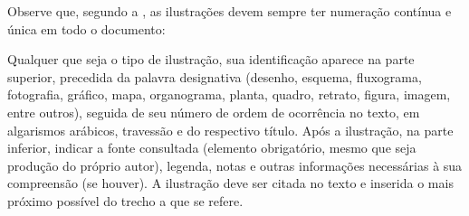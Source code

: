 Observe que, segundo a , as
ilustrações devem sempre ter numeração contínua e única em todo o documento:

\begin{citacao}
Qualquer que seja o tipo de ilustração, sua identificação aparece na parte
superior, precedida da palavra designativa (desenho, esquema, fluxograma,
fotografia, gráfico, mapa, organograma, planta, quadro, retrato, figura,
imagem, entre outros), seguida de seu número de ordem de ocorrência no texto,
em algarismos arábicos, travessão e do respectivo título. Após a ilustração, na
parte inferior, indicar a fonte consultada (elemento obrigatório, mesmo que
seja produção do próprio autor), legenda, notas e outras informações
necessárias à sua compreensão (se houver). A ilustração deve ser citada no
texto e inserida o mais próximo possível do trecho a que se
refere. \cite[seções 5.8]{NBR14724:2011}
\end{citacao}










